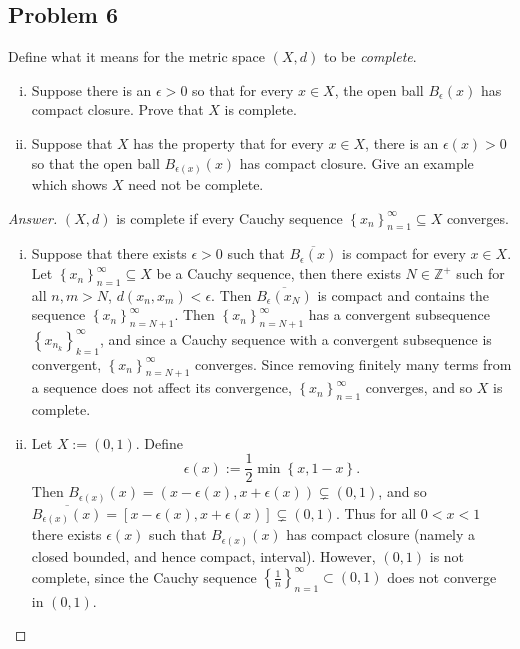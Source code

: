 \documentclass[12pt]{article}
\newcommand{\z}{\mathbb{Z}}
\newcommand{\ita}[1]{\textit{#1}}
\newcommand\paren[1]{\left( #1 \right)}
\newcommand\setb[1]{\left \{ #1 \right \}}
\newcommand{\sqbrack}[1]{\left [ #1 \right ]}
\theoremstyle{definition}
\begin{document}
\subsection{Problem 6}
Define what it means for the metric space $(X,d)$ to be \ita{complete}.
\begin{enumerate}[(i)]
    \item Suppose there is an $\epsilon > 0$ so that for every $x \in X$, the open ball $B_{\epsilon}(x)$ has compact closure. Prove that $X$ is complete.
    \item Suppose that $X$ has the property that for every $x \in X$, there is an $\epsilon(x) > 0$ so that the open ball $B_{\epsilon(x)}(x)$ has compact closure. Give an example which shows $X$ need not be complete.
\end{enumerate}
\begin{proof}[Answer]
    $(X,d)$ is complete if every Cauchy sequence $\setb{ x_n }_{n = 1}^{\infty} \subseteq X$ converges.
    \begin{enumerate}[(i)]
        \item Suppose that there exists $\epsilon > 0$ such that $\overline{B_{\epsilon}(x)}$ is compact for every $x \in X$. Let $\setb{ x_n }_{n = 1}^{\infty} \subseteq X$ be a Cauchy sequence, then there exists $N \in \z^+$ such for all $n , m > N$, $d \paren{ x_n , x_m } < \epsilon$. Then $\overline{B_{\epsilon} \paren{ x_N } }$ is compact and contains the sequence $\setb{ x_n }_{n = N+1}^{\infty}$. Then $\setb{ x_n }_{n = N+1}^{\infty}$ has a convergent subsequence $\setb{ x_{n_k} }_{k = 1}^{\infty}$, and since a Cauchy sequence with a convergent subsequence is convergent, $\setb{ x_n }_{n = N+1}^{\infty}$ converges. Since removing finitely many terms from a sequence does not affect its convergence, $\setb{ x_n }_{n = 1}^{\infty}$ converges, and so $X$ is complete.
        \item Let $X := (0,1)$. Define 
        \[
            \epsilon(x) := \frac{1}{2} \min \setb{ x , 1 - x }.
        \]
        Then $B_{\epsilon(x)}(x) = \paren{ x - \epsilon(x) , x + \epsilon(x) } \subsetneq (0,1) $, and so $\overline{ B_{\epsilon(x)}(x) } = \sqbrack{ x - \epsilon(x) , x + \epsilon(x) } \subsetneq (0,1)$. Thus for all $0 < x < 1$ there exists $\epsilon(x)$ such that $B_{\epsilon(x)}(x)$ has compact closure (namely a closed bounded, and hence compact, interval). However, $(0,1)$ is not complete, since the Cauchy sequence $\setb{ \frac{1}{n} }_{n = 1}^{\infty} \subset (0,1)$ does not converge in $(0,1)$.
    \end{enumerate}
\end{proof}
\end{document}
